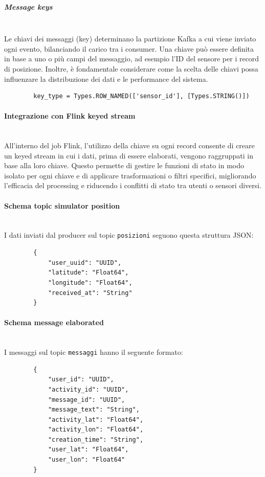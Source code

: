 \documentclass[10pt]{article}
\newcommand{\myparagraph}[1]{\paragraph{#1}\mbox{}\\}
\newcommand{\mysubparagraph}[1]{\subparagraph{#1}\mbox{}\\}
\begin{document}
        \mysubparagraph{Message keys}
        Le chiavi dei messaggi (key) determinano la partizione Kafka a cui viene inviato ogni evento, bilanciando il carico tra i consumer. Una chiave può essere definita in base a uno o più campi del messaggio, ad esempio l'ID del sensore per i record di posizione. Inoltre, è fondamentale considerare come la scelta delle chiavi possa influenzare la distribuzione dei dati e le performance del sistema.
        \begin{lstlisting}
        key_type = Types.ROW_NAMED(['sensor_id'], [Types.STRING()])
        \end{lstlisting}

        \myparagraph{Integrazione con Flink keyed stream}
        All’interno del job Flink, l'utilizzo della chiave su ogni record consente di creare un keyed stream
        in cui i dati, prima di essere elaborati, vengono raggruppati in base alla loro chiave. Questo permette
        di gestire le funzioni di stato in modo isolato per ogni chiave e di applicare trasformazioni o filtri
        specifici, migliorando l’efficacia del processing e riducendo i conflitti di stato tra utenti o sensori
        diversi.

        \myparagraph{Schema topic simulator position}
        I dati inviati dal producer sul topic \texttt{posizioni} seguono questa struttura JSON: \\
        \begin{lstlisting}
        {
            "user_uuid": "UUID",
            "latitude": "Float64",
            "longitude": "Float64",
            "received_at": "String"
        }
        \end{lstlisting}

        \myparagraph{Schema message elaborated}
        I messaggi sul topic \texttt{messaggi} hanno il seguente formato: \\
        \begin{lstlisting}
        {
            "user_id": "UUID",
            "activity_id": "UUID",
            "message_id": "UUID",
            "message_text": "String",
            "activity_lat": "Float64",
            "activity_lon": "Float64",
            "creation_time": "String",
            "user_lat": "Float64",
            "user_lon": "Float64"
        }
        \end{lstlisting}
\end{document}
